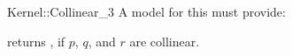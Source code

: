 \begin{ccRefFunctionObjectConcept}{Kernel::Collinear_3}
A model for this must provide:


{returns , if $p$, $q$, and $r$ are collinear.}

\ccIsModel{}

\end{ccRefFunctionObjectConcept}

